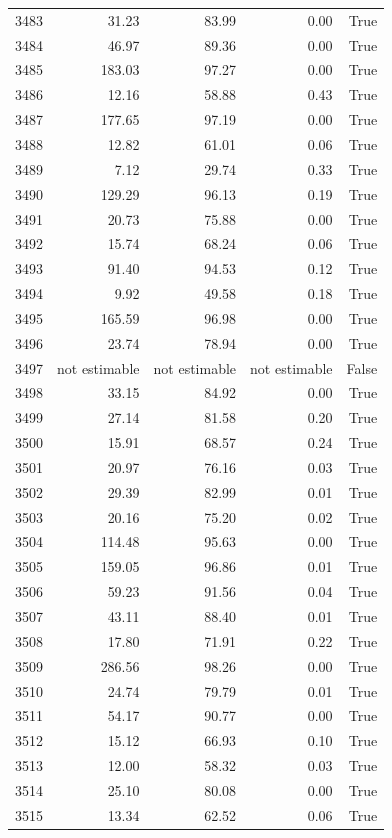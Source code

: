 \begin{longtable}{rrrrr}
3483 & 31.23 & 83.99 & 0.00 & True \\
3484 & 46.97 & 89.36 & 0.00 & True \\
3485 & 183.03 & 97.27 & 0.00 & True \\
3486 & 12.16 & 58.88 & 0.43 & True \\
3487 & 177.65 & 97.19 & 0.00 & True \\
3488 & 12.82 & 61.01 & 0.06 & True \\
3489 & 7.12 & 29.74 & 0.33 & True \\
3490 & 129.29 & 96.13 & 0.19 & True \\
3491 & 20.73 & 75.88 & 0.00 & True \\
3492 & 15.74 & 68.24 & 0.06 & True \\
3493 & 91.40 & 94.53 & 0.12 & True \\
3494 & 9.92 & 49.58 & 0.18 & True \\
3495 & 165.59 & 96.98 & 0.00 & True \\
3496 & 23.74 & 78.94 & 0.00 & True \\
3497 & not estimable & not estimable & not estimable & False \\
3498 & 33.15 & 84.92 & 0.00 & True \\
3499 & 27.14 & 81.58 & 0.20 & True \\
3500 & 15.91 & 68.57 & 0.24 & True \\
3501 & 20.97 & 76.16 & 0.03 & True \\
3502 & 29.39 & 82.99 & 0.01 & True \\
3503 & 20.16 & 75.20 & 0.02 & True \\
3504 & 114.48 & 95.63 & 0.00 & True \\
3505 & 159.05 & 96.86 & 0.01 & True \\
3506 & 59.23 & 91.56 & 0.04 & True \\
3507 & 43.11 & 88.40 & 0.01 & True \\
3508 & 17.80 & 71.91 & 0.22 & True \\
3509 & 286.56 & 98.26 & 0.00 & True \\
3510 & 24.74 & 79.79 & 0.01 & True \\
3511 & 54.17 & 90.77 & 0.00 & True \\
3512 & 15.12 & 66.93 & 0.10 & True \\
3513 & 12.00 & 58.32 & 0.03 & True \\
3514 & 25.10 & 80.08 & 0.00 & True \\
3515 & 13.34 & 62.52 & 0.06 & True \\

\end{longtable}
